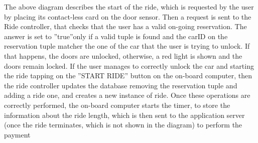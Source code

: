 \documentclass{article}
\begin{document}
\begin{flushleft}
The above diagram describes the start of the ride, which is requested by the user by placing its contact-less card on the door sensor. Then a request is sent to the Ride controller, that checks that the user has a valid on-going reservation. The answer is set to ''true''only if a valid tuple is found and the carID on the reservation tuple matcher the one of the car that the user is trying to unlock. If that happens, the doors are unlocked, otherwise, a red light is shown and the doors remain locked.
If the user manages to correctly unlock the car and starting the ride tapping on the ''START RIDE'' button on the on-board computer, then the ride controller updates the database removing the reservation tuple and adding a ride one, and creates a new instance of ride. Once these operations are correctly performed, the on-board computer starts the timer, to store the information about the ride length, which is then sent to the application server (once the ride terminates, which is not shown in the diagram) to perform the payment 


\end{flushleft}
\end{document}
